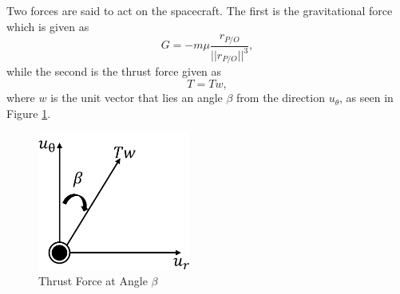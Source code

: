 \documentclass[]{article}
\begin{document}
\vspace{2mm}\newline
Two forces are said to act on the spacecraft. The first is the gravitational force which is given as
\begin{equation} \label{grav_force}
	G = -m\mu\frac{r_{P/O}}{||r_{P/O}||^3},
\end{equation}
while the second is the thrust force given as\\
\begin{equation} \label{thrust_force}
	T = Tw,
\end{equation}
where \(w\) is the unit vector that lies an angle \(\beta\) from the direction \(u_{\theta}\), as seen in Figure \ref{fig:beta}.
\begin{figure}
	\centering
	\includegraphics[width=50mm,scale=0.5]{beta.png}
	\caption{Thrust Force at Angle \(\beta\)}
	\label{fig:beta}
\end{figure}
\end{document}
